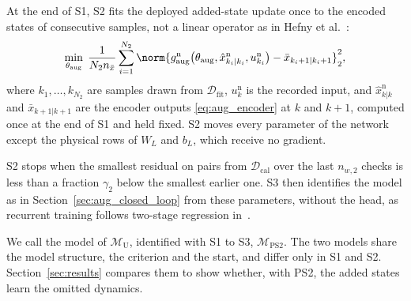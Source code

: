 At the end of S1, S2 fits the deployed added-state update once to the encoded
states of consecutive samples, not a linear operator as in Hefny et
al.~\cite[Sec.~3]{hefny2015supervised}:
\begin{equation}
 \min_{\theta_{\mathrm{aug}}}\;
 \frac{1}{N_2n_{\bar x}}\sum_{i=1}^{N_2}
 \norm{g^{\mathrm n}_{\mathrm{aug}}\bigl(\theta_{\mathrm{aug}},
  \hat x^{\mathrm n}_{k_i|k_i},u^{\mathrm n}_{k_i}\bigr)
  -\bar x_{k_i+1|k_i+1}}_2^2,
 \label{eq:ps2_s2}
\end{equation}
where $k_1,\dots,k_{N_2}$ are samples drawn from $\mathcal D_{\mathrm{fit}}$,
$u^{\mathrm n}_k$ is the recorded input, and $\hat x^{\mathrm n}_{k|k}$ and
$\bar x_{k+1|k+1}$ are the encoder outputs \eqref{eq:aug_encoder} at $k$ and
$k+1$, computed once at the end of S1 and held fixed.
S2 moves every parameter of the network except the physical rows of $W_L$
and $b_L$, which receive no gradient.

S2 stops when the smallest residual on pairs from $\mathcal D_{\mathrm{cal}}$
over the last $n_{w,2}$ checks is less than a fraction $\gamma_2$ below the
smallest earlier one.
S3 then identifies the model as in Section~\ref{sec:aug_closed_loop} from
these parameters, without the head, as recurrent training follows two-stage
regression in~\cite[Sec.~4.2]{downey2017psrnn}.

We call the model of $\mathcal M_{\mathrm U}$, identified with S1 to S3,
$\mathcal M_{\mathrm{PS2}}$.
The two models share the model structure, the criterion and the start, and
differ only in S1 and S2.
Section~\ref{sec:results} compares them to show whether, with PS2, the added
states learn the omitted dynamics.
